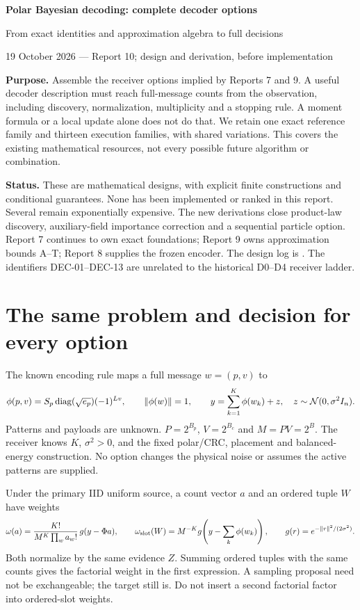 \documentclass[10pt,a4paper]{article}
\begin{document}
{\LARGE\bfseries Polar Bayesian decoding: complete decoder options}\par
{\large From exact identities and approximation algebra to full decisions}\par
{\color{muted}19 October 2026 --- Report 10; design and derivation, before implementation}

\textbf{Purpose.} Assemble the receiver options implied by Reports 7 and 9. A useful decoder description
must reach full-message counts from the observation, including discovery, normalization, multiplicity
and a stopping rule. A moment formula or a local update alone does not do that.
We retain one exact reference family and thirteen execution families, with shared variations.
This covers the existing mathematical resources, not every possible future algorithm or combination.

\textbf{Status.} These are mathematical designs, with explicit finite constructions and conditional
guarantees. None has been implemented or ranked in this report. Several remain exponentially expensive.
The new derivations close product-law discovery, auxiliary-field importance correction and a sequential
particle option. Report 7 continues to own exact foundations; Report 9 owns approximation bounds A--T;
Report 8 supplies the frozen encoder. The design log is .
The identifiers DEC-01--DEC-13 are unrelated to the historical D0--D4 receiver ladder.

\section{The same problem and decision for every option}
\label{sec:contract}
The known encoding rule maps a full message $w=(p,v)$ to
\[
 \phi(p,v)=S_p\operatorname{diag}(\sqrt{e_p})(-1)^{Lv},\qquad
 \|\phi(w)\|=1,\qquad
 y=\sum_{k=1}^K\phi(w_k)+z,\quad z\sim\mathcal N(0,\sigma^2I_n).
\]
Patterns and payloads are unknown. $P=2^{B_p}$, $V=2^{B_c}$ and $M=PV=2^B$.
The receiver knows $K$, $\sigma^2>0$, and the fixed polar/CRC, placement and balanced-energy construction.
No option changes the physical noise or assumes the active patterns are supplied.

Under the primary IID uniform source, a count vector $a$ and an ordered tuple $W$ have weights
\begin{equation}
 \omega(a)=\frac{K!}{M^K\prod_w a_w!}\,g(y-\Phi a),\qquad
 \omega_{\rm slot}(W)=M^{-K}g\!\left(y-\sum_k\phi(w_k)\right),\qquad
 g(r)=e^{-\|r\|^2/(2\sigma^2)}.
 \label{eq:target}
\end{equation}
Both normalize by the same evidence $Z$. Summing ordered tuples with the same counts gives the factorial
weight in the first expression. A sampling proposal need not be exchangeable; the target still is.
Do not insert a second factorial factor into ordered-slot weights.
\end{document}
